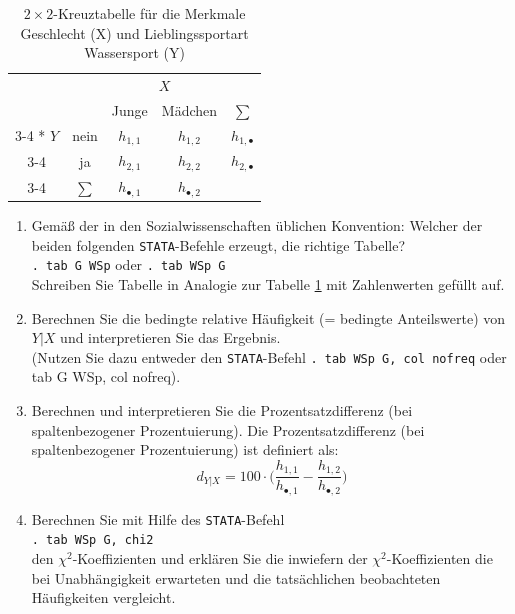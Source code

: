\documentclass[11pt]{article}
\begin{document}
\begin{enumerate}
   \begin{table}[h]
  \centering
    \setlength{\extrarowheight}{2pt}
    \begin{tabular}{cc|c|c|c}
      & \multicolumn{1}{c}{} & \multicolumn{2}{c}{ $X$}\\
      & \multicolumn{1}{c}{} & \multicolumn{1}{c}{Junge}  & \multicolumn{1}{c}{Mädchen} & \multicolumn{1}{c}{$\sum$}\\\cline{3-4}
      \multirow{2}*{ $Y$}  & nein & $h_{1,1}$ & $h_{1,2}$ &$h_{1,\bullet}$ \\\cline{3-4}
      & ja &  $h_{2,1}$ &  $h_{2,2}$ & $ h_{2,\bullet}$ \\\cline{3-4}
     & \multicolumn{1}{c}{$\sum$ } & \multicolumn{1}{c}{$h_{\bullet,1}$}  & \multicolumn{1}{c}{$ h_{\bullet,2}$} & \multicolumn{1}{c}{}
    \end{tabular}
    \caption{ \label{tab2by2}$2 \times 2$-Kreuztabelle für die Merkmale Geschlecht (X) und Lieblingssportart Wassersport (Y)}
  \end{table}
\begin{enumerate}
\item{Gemäß der in den Sozialwissenschaften üblichen Konvention: Welcher der beiden folgenden \texttt{STATA}-Befehle
erzeugt, die richtige Tabelle? \\ \texttt{. tab G WSp} oder \texttt{. tab  WSp G} \\
Schreiben Sie Tabelle in Analogie zur Tabelle \ref{tab2by2} mit Zahlenwerten gefüllt auf.}
\item{Berechnen Sie die bedingte relative Häufigkeit (= bedingte Anteilswerte) von $Y|X$ und interpretieren Sie das 
Ergebnis.\\ (Nutzen Sie dazu entweder den \texttt{STATA}-Befehl \texttt{. tab WSp G, col nofreq} oder
tab  G WSp, col nofreq).}
\item{Berechnen und interpretieren  Sie die Prozentsatzdifferenz (bei spaltenbezogener Prozentuierung).
Die Prozentsatzdifferenz (bei spaltenbezogener Prozentuierung) ist definiert als:
$$d_{Y|X} = 100 \cdot \bigg( \frac{h_{1,1}}{h_{\bullet,1}}-\frac{h_{1,2}}{h_{\bullet,2}}\bigg)$$ }
\item{Berechnen Sie mit Hilfe des \texttt{STATA}-Befehl\\ \texttt{. tab WSp G, chi2}\\ den $\chi^{2}$-Koeffizienten
und erklären Sie die inwiefern der $\chi^{2}$-Koeffizienten die bei Unabhängigkeit erwarteten und die tatsächlichen beobachteten
Häufigkeiten vergleicht.}
\end{enumerate}




\end{enumerate}
\end{document}
